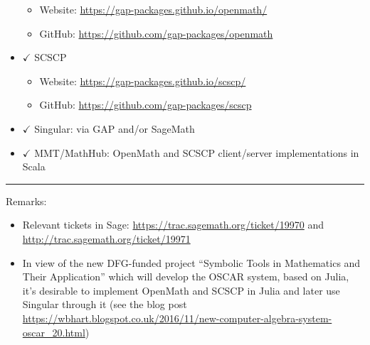 \begin{itemize}
  \begin{itemize}
  \tightlist
  \item
    Website: \url{https://gap-packages.github.io/openmath/}
  \item
    GitHub: \url{https://github.com/gap-packages/openmath}
  \end{itemize}
\item
  \(\checkmark\) SCSCP

  \begin{itemize}
  \tightlist
  \item
    Website: \url{https://gap-packages.github.io/scscp/}
  \item
    GitHub: \url{https://github.com/gap-packages/scscp}
  \end{itemize}
\item
  \(\checkmark\) Singular: via GAP and/or SageMath
\item
  \(\checkmark\) MMT/MathHub: OpenMath and SCSCP client/server
  implementations in Scala
\end{itemize}

\begin{center}\rule{0.5\linewidth}{\linethickness}\end{center}

Remarks:

\begin{itemize}
\tightlist
\item
  Relevant tickets in Sage: \url{https://trac.sagemath.org/ticket/19970}
  and \url{http://trac.sagemath.org/ticket/19971}
\item
  In view of the new DFG-funded project
  ``Symbolic Tools in Mathematics and Their Application'' which will
  develop the OSCAR system, based on Julia,
  it's desirable to implement OpenMath and SCSCP in Julia and later use
  Singular through it (see the blog post
  \url{https://wbhart.blogspot.co.uk/2016/11/new-computer-algebra-system-oscar_20.html})
\end{itemize}
